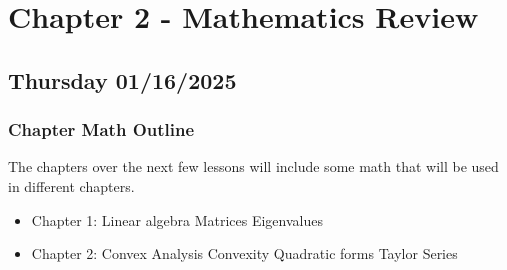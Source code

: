 \section{Chapter 2 - Mathematics Review}
\subsection{Thursday 01/16/2025}
\subsubsection{Chapter Math Outline}
The chapters over the next few lessons will include some math that will be used in different chapters.
\begin{itemize}
  \item Chapter 1: Linear algebra
  \subitem Matrices
  \subitem Eigenvalues
  \item Chapter 2: Convex Analysis
  \subitem Convexity
  \subitem Quadratic forms
  \subitem Taylor Series
\end{itemize}

